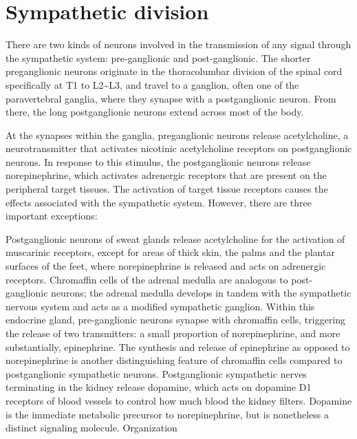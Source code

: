 \documentclass[]{book}
\begin{document}
\hypertarget{sympathetic-division}{%
\section{Sympathetic division}\label{sympathetic-division}}

There are two kinds of neurons involved in the transmission of any signal through the sympathetic system: pre-ganglionic and post-ganglionic. The shorter preganglionic neurons originate in the thoracolumbar division of the spinal cord specifically at T1 to L2\textasciitilde{}L3, and travel to a ganglion, often one of the paravertebral ganglia, where they synapse with a postganglionic neuron. From there, the long postganglionic neurons extend across most of the body.

At the synapses within the ganglia, preganglionic neurons release acetylcholine, a neurotransmitter that activates nicotinic acetylcholine receptors on postganglionic neurons. In response to this stimulus, the postganglionic neurons release norepinephrine, which activates adrenergic receptors that are present on the peripheral target tissues. The activation of target tissue receptors causes the effects associated with the sympathetic system. However, there are three important exceptions:

Postganglionic neurons of sweat glands release acetylcholine for the activation of muscarinic receptors, except for areas of thick skin, the palms and the plantar surfaces of the feet, where norepinephrine is released and acts on adrenergic receptors.
Chromaffin cells of the adrenal medulla are analogous to post-ganglionic neurons; the adrenal medulla develops in tandem with the sympathetic nervous system and acts as a modified sympathetic ganglion. Within this endocrine gland, pre-ganglionic neurons synapse with chromaffin cells, triggering the release of two transmitters: a small proportion of norepinephrine, and more substantially, epinephrine. The synthesis and release of epinephrine as opposed to norepinephrine is another distinguishing feature of chromaffin cells compared to postganglionic sympathetic neurons.
Postganglionic sympathetic nerves terminating in the kidney release dopamine, which acts on dopamine D1 receptors of blood vessels to control how much blood the kidney filters. Dopamine is the immediate metabolic precursor to norepinephrine, but is nonetheless a distinct signaling molecule.
Organization
\end{document}
